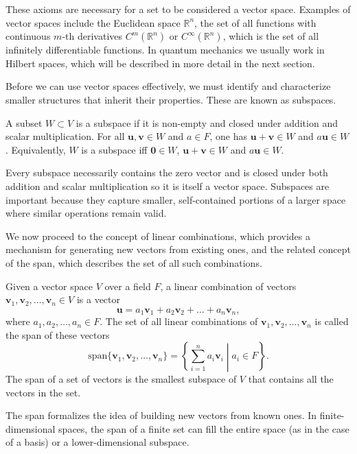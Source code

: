 These axioms are necessary for a set to be considered a vector space. Examples of vector spaces include the Euclidean space $\mathbb{R}^n$, the set of all functions with continuous $m$-th derivatives $C^m(\mathbb{R}^n)$ or $C^\infty(\mathbb{R}^n)$, which is the set of all infinitely differentiable functions. In quantum mechanics we usually work in Hilbert spaces, which will be described in more detail in the next section.

Before we can use vector spaces effectively, we must identify and characterize smaller structures that inherit their properties. These are known as subspaces.
\begin{definition}[Subspace]
A subset $W\subset V$ is a subspace if it is non-empty and closed under addition and scalar multiplication. For all $\symbf{u},\symbf{v}\in W$ and $a\in F$, one has $\symbf{u}+\symbf{v}\in W$ and $a\symbf{u}\in W$. Equivalently, $W$ is a subspace iff $\symbf{0}\in W$, $\symbf{u}+\symbf{v}\in W$ and $a\symbf{u}\in W$.
\end{definition}
Every subspace necessarily contains the zero vector and is closed under both addition and scalar multiplication so it is itself a vector space. Subspaces are important because they capture smaller, self-contained portions of a larger space where similar operations remain valid.

We now proceed to the concept of linear combinations, which provides a mechanism for generating new vectors from existing ones, and the related concept of the span, which describes the set of all such combinations.
\begin{definition}
Given a vector space $V$ over a field $F$, a linear combination of vectors $\symbf{v}_1,\symbf{v}_2,\ldots,\symbf{v}_n\in V$ is a vector
\begin{equation}
\symbf{u}=a_1\symbf{v}_1+a_2\symbf{v}_2+\ldots+a_n\symbf{v}_n,
\end{equation}
where $a_1,a_2,\ldots,a_n\in F$. The set of all linear combinations of ${\symbf{v}_1,\symbf{v}_2,\ldots,\symbf{v}_n}$ is called the span of these vectors
\begin{equation}
\text{span}\lbrace\symbf{v}_1,\symbf{v}_2,\ldots,\symbf{v}_n\rbrace=\left\lbrace\sum_{i=1}^n a_i\symbf{v}_i\middle\vert a_i\in F\right\rbrace.
\end{equation}
The span of a set of vectors is the smallest subspace of $V$ that contains all the vectors in the set.
\end{definition}
The span formalizes the idea of building new vectors from known ones. In finite-dimensional spaces, the span of a finite set can fill the entire space (as in the case of a basis) or a lower-dimensional subspace.

